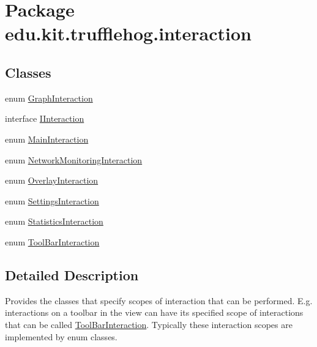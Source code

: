 \hypertarget{namespaceedu_1_1kit_1_1trufflehog_1_1interaction}{}\section{Package edu.\+kit.\+trufflehog.\+interaction}
\label{namespaceedu_1_1kit_1_1trufflehog_1_1interaction}
\subsection*{Classes}
\begin{DoxyCompactItemize}
\item 
enum \hyperlink{enumedu_1_1kit_1_1trufflehog_1_1interaction_1_1_graph_interaction}{Graph\+Interaction}
\item 
interface \hyperlink{interfaceedu_1_1kit_1_1trufflehog_1_1interaction_1_1_i_interaction}{I\+Interaction}
\item 
enum \hyperlink{enumedu_1_1kit_1_1trufflehog_1_1interaction_1_1_main_interaction}{Main\+Interaction}
\item 
enum \hyperlink{enumedu_1_1kit_1_1trufflehog_1_1interaction_1_1_network_monitoring_interaction}{Network\+Monitoring\+Interaction}
\item 
enum \hyperlink{enumedu_1_1kit_1_1trufflehog_1_1interaction_1_1_overlay_interaction}{Overlay\+Interaction}
\item 
enum \hyperlink{enumedu_1_1kit_1_1trufflehog_1_1interaction_1_1_settings_interaction}{Settings\+Interaction}
\item 
enum \hyperlink{enumedu_1_1kit_1_1trufflehog_1_1interaction_1_1_statistics_interaction}{Statistics\+Interaction}
\item 
enum \hyperlink{enumedu_1_1kit_1_1trufflehog_1_1interaction_1_1_tool_bar_interaction}{Tool\+Bar\+Interaction}
\end{DoxyCompactItemize}


\subsection{Detailed Description}
Provides the classes that specify scopes of interaction that can be performed. E.\+g. interactions on a toolbar in the view can have its specified scope of interactions that can be called \hyperlink{enumedu_1_1kit_1_1trufflehog_1_1interaction_1_1_tool_bar_interaction}{Tool\+Bar\+Interaction}. Typically these interaction scopes are implemented by enum classes. 